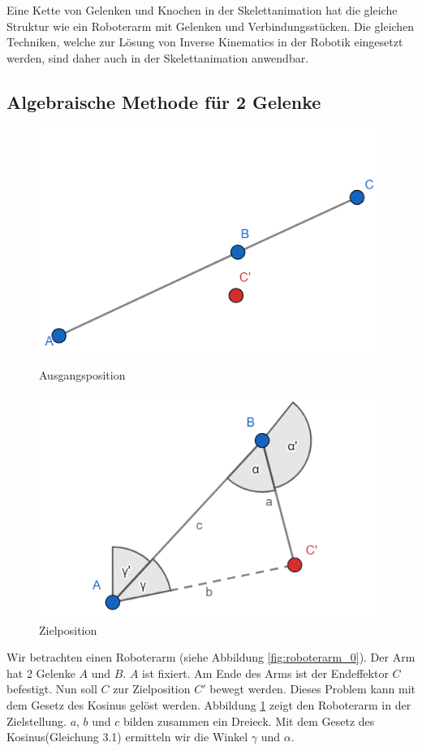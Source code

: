 Eine Kette von Gelenken und Knochen in der Skelettanimation hat die gleiche Struktur wie ein Roboterarm mit Gelenken und Verbindungsstücken. Die gleichen Techniken, welche zur Lösung von Inverse Kinematics in der Robotik eingesetzt werden, sind daher auch in der Skelettanimation anwendbar.
%
\subsection{Algebraische Methode für 2 Gelenke}
\begin{figure}[!htb]
	\includegraphics[width=\linewidth]{geogebra/roboterarm_0.png}
	\caption{Ausgangsposition}\label{fig:roboterarm_0}
	\endminipage\hfill
	\includegraphics[width=\linewidth]{geogebra/roboterarm_1.png}
	\caption{Zielposition}\label{fig:roboterarm_1}
	\endminipage\hfill
\end{figure}
Wir betrachten einen Roboterarm (siehe Abbildung \ref{fig:roboterarm_0}). Der Arm hat 2 Gelenke $A$ und $B$. $A$ ist fixiert. Am Ende des Arms ist der Endeffektor $C$ befestigt. Nun soll $C$ zur Zielposition $C'$ bewegt werden. Dieses Problem kann mit dem Gesetz des Kosinus gelöst werden. Abbildung \ref{fig:roboterarm_1} zeigt den Roboterarm in der Zielstellung. $a$, $b$ und $c$ bilden zusammen ein Dreieck. Mit dem Gesetz des Kosinus(Gleichung 3.1) ermitteln wir die Winkel $\gamma$ und $\alpha$.\\
